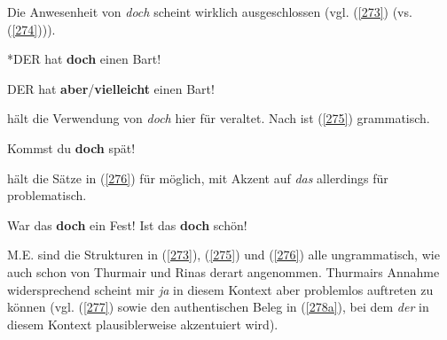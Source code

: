Die Anwesenheit von \textit{doch} scheint wirklich ausgeschlossen (vgl. (\ref{273}) (vs. (\ref{274}))).

\begin{exe}
	\ex\label{273} 
	*DER hat \textbf{doch} einen Bart!
\end{exe}
\vspace{-0.65cm}	
\begin{exe}
	\ex\label{274} 
	DER hat \textbf{aber}/\textbf{vielleicht} einen Bart!	
			\hfill\hbox {\citet[218]{Rinas2006}}
\end{exe}																	     
\citet[141]{Hentschel1986} hält die Verwendung von \textit{doch} hier für veraltet. Nach \citet[26]{Weydt1969} ist (\ref{275}) grammatisch.

\begin{exe}
	\ex\label{275} 
	Kommst du \textbf{doch} spät!
\end{exe}
\citet[141]{Hentschel1986} hält die Sätze in (\ref{276}) für \glqq möglich\grqq{}, mit Akzent auf \textit{das} allerdings für  \glqq problematisch\grqq{}. 

\begin{exe}
	\ex\label{276} 
		\begin{xlist}	
			\ex\label{276a} War das \textbf{doch} ein Fest!	
			\ex\label{276b} Ist das \textbf{doch} schön!
		\end{xlist}
\end{exe}
M.E. sind die Strukturen in (\ref{273}), (\ref{275}) und (\ref{276}) alle ungrammatisch, wie auch schon von Thurmair und Rinas derart angenommen. Thurmairs Annahme widersprechend scheint mir \textit{ja} in diesem Kontext aber problemlos auftreten zu können (vgl. (\ref{277}) sowie den authentischen Beleg in (\ref{278a}), bei dem \textit{der} in diesem Kontext plausiblerweise akzentuiert wird).

